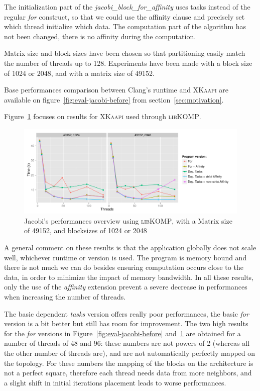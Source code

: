 \documentclass{Styles/llncs}
\newcommand{\kaapi}{\textsc{\mbox{XKaapi}}\xspace}
\newcommand{\libXKOMP}{\textsc{libKOMP}\xspace}
\begin{document}
The initialization part of the \textit{jacobi\_block\_for\_affinity} uses tasks
instead of the regular \emph{for} construct, so that we could use the affinity clause and precisely
set which thread initialize which data.
The computation part of the algorithm has not been changed, there is no affinity
during the computation.

Matrix size and block sizes have been chosen so that partitioning easily match
the number of threads up to 128. Experiments have been made with a block size of 1024
or 2048, and with a matrix size of 49152.

Base performances comparison between Clang's runtime and \kaapi are available on figure~\ref{fig:eval-jacobi-before} from section~\ref{sec:motivation}.

Figure~\ref{fig:eval-jacobi} focuses on results for \kaapi used through \libXKOMP.

\begin{figure}[t]
  \centering
  \includegraphics[scale=0.6]{graphs/jacobi_scale.pdf}
  \caption{Jacobi's performances overview using \libXKOMP, with a Matrix size of 49152, and blocksizes of 1024 or 2048}
\label{fig:eval-jacobi}
\end{figure}

A general comment on these results is that the application globally does not scale well, whichever runtime or version is used.
The program is memory bound and there is not much we can do besides ensuring computation occurs
close to the data, in order to minimize the impact of memory bandwidth.
In all these results, only the use of the \emph{affinity} extension prevent
a severe decrease in performances when increasing the number of threads.

The basic dependent \emph{tasks} version offers really poor performances, the basic
\emph{for} version is a bit better but still has room for improvement.
The two high results for the \emph{for} versions in Figure~\ref{fig:eval-jacobi-before} and~\ref{fig:eval-jacobi}
are obtained for a number of threads of 48 and 96: these numbers are not powers
of 2 (whereas all the other number of threads are), and are not automatically perfectly mapped on the topology. For these
numbers the mapping of the blocks on the architecture is not a perfect square,
therefore each thread needs data from more neighbors, and a slight shift in
initial iterations placement leads to worse performances.
\end{document}
